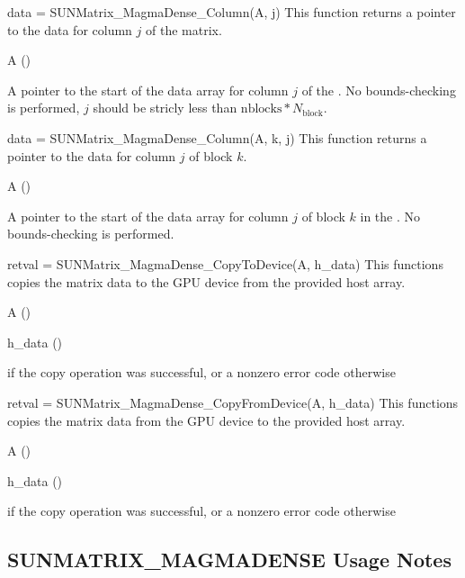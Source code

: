 {
  data = SUNMatrix\_MagmaDense\_Column(A, j)
}
{
  This function returns a pointer to the data for column $j$ of the matrix.
}
{
  \begin{args}
  \item[A] ()
  \end{args}
}
{
  A pointer to the start of the data array for column $j$ of the .
}
{
  No bounds-checking is performed, $j$ should be stricly less than
  $\text{nblocks} * N_{\text{block}}$.
}

{
  data = SUNMatrix\_MagmaDense\_Column(A, k, j)
}
{
  This function returns a pointer to the data for column $j$ of block $k$.
}
{
  \begin{args}
  \item[A] ()
  \end{args}
}
{
  A pointer to the start of the data array for column $j$ of block $k$ in the
  .
}
{
  No bounds-checking is performed.
}


{
  retval = SUNMatrix\_MagmaDense\_CopyToDevice(A, h\_data)
}
{
  This functions copies the matrix data to the GPU device from the provided
  host array.
}
{
  \begin{args}
  \item[A] ()
  \item[h\_data] ()
  \end{args}
}
{
   if the copy operation was successful, or a nonzero error
  code otherwise
}
{}

{
  retval = SUNMatrix\_MagmaDense\_CopyFromDevice(A, h\_data)
}
{
  This functions copies the matrix data from the GPU device to the provided
  host array.
}
{
  \begin{args}
  \item[A] ()
  \item[h\_data] ()
  \end{args}
}
{
   if the copy operation was successful, or a nonzero error
  code otherwise
}
{}

\subsection{SUNMATRIX\_MAGMADENSE Usage Notes}
\label{ss:sunmat_magmadense_notes}

